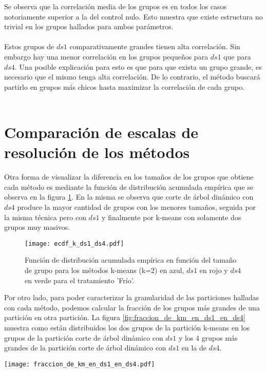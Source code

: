 Se observa que la correlación media de los grupos es en todos los casos notoriamente superior a la del control nulo. Esto muestra que existe estructura no trivial en los grupos hallados para ambos parámetros. \\\\
Estos grupos de $ds1$ comparativamente grandes tienen alta correlación. Sin embargo hay una menor correlación en los grupos pequeños para $ds1$ que para $ds4$. Una posible explicación para esto es que para que exista un grupo grande, es necesario que el mismo tenga alta correlación. De lo contrario, el método buscará partirlo en grupos más chicos hasta maximizar la correlación de cada grupo.\\\\
\clearpage
\section{Comparación de escalas de resolución de los métodos}
Otra forma de visualizar la diferencia en los tamaños de los grupos que obtiene cada método es mediante la función de distribución acumulada empírica que se observa en la figura \ref{fig:ecdf_k_ds1_ds4}. En la misma se observa que corte de árbol dinámico con $ds4$ produce la mayor cantidad de grupos con los menores tamaños, seguida por la misma técnica pero con $ds1$ y finalmente por k-means con solamente dos grupos muy masivos.
\begin{figure}[h]
    \centering
    \texttt{[image: ecdf\_k\_ds1\_ds4.pdf]}
    \caption{Función de distribución acumulada empírica en función del tamaño de grupo para los métodos k-means (k=2) en azul, $ds1$ en rojo y $ds4$ en verde para el tratamiento 'Frío'.}
    \label{fig:ecdf_k_ds1_ds4}
\end{figure}
Por otro lado, para poder caracterizar la granularidad de las particiones halladas con cada método, podemos calcular la fracción de los grupos más grandes de una partición en otra partición. La figura \ref{fig:fraccion_de_km_en_ds1_en_ds4} muestra como están distribuidos los dos grupos de la partición k-means en los grupos de la partición corte de árbol dinámico con $ds1$ y los 4 grupos más grandes de la partición corte de árbol dinámico con $ds1$ en la de $ds4$.
\begin{sidewaysfigure}
    \centering
    \texttt{[image: fraccion\_de\_km\_en\_ds1\_en\_ds4.pdf]}
    \caption{Fracción de grupos de una partición más fina dentro de grupos en una partición más gruesa para el tratamiento 'Frío', con $ds1$, $ds4$ y k-means. En rojo, aquellos subgrupos que están contenidos en más de un 50\% en el grupo. La linea punteada marca el porcentaje del grupo que representa el total del subgrupo.}
    \label{fig:fraccion_de_km_en_ds1_en_ds4}
\end{sidewaysfigure}
    
